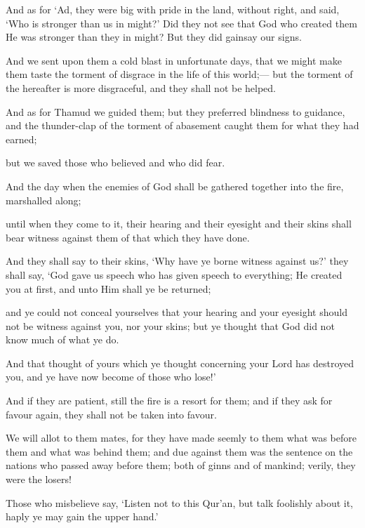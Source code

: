 \documentclass[fontsize=14pt, letterpaper, notitlepage, openany, DIV=12]{scrbook} %
\begin{document}
\noindent[41:15]
And as for `Ad, they were big with pride in the land, without right, and said, `Who is
stronger than us in might?' Did they not see that God who created them He was stronger than
they in might? But they did gainsay our signs.

\noindent[41:16]
And we sent upon them a cold blast in unfortunate days, that we might make them taste
the torment of disgrace in the life of this world;--- but the torment of the hereafter is more
disgraceful, and they shall not be helped.

\noindent[41:17]
And as for Thamud we guided them; but they preferred blindness to guidance, and the
thunder-clap of the torment of abasement caught them for what they had earned;

\noindent[41:18]
but we saved those who believed and who did fear.

\noindent[41:19]
And the day when the enemies of God shall be gathered together into the fire, marshalled
along;

\noindent[41:20]
until when they come to it, their hearing and their eyesight and their skins shall bear
witness against them of that which they have done.

\noindent[41:21]
And they shall say to their skins, `Why have ye borne witness against us?' they shall say,
`God gave us speech who has given speech to everything; He created you at first, and unto Him
shall ye be returned;

\noindent[41:22]
and ye could not conceal yourselves that your hearing and your eyesight should not be
witness against you, nor your skins; but ye thought that God did not know much of what ye do.

\noindent[41:23]
And that thought of yours which ye thought concerning your Lord has destroyed you, and
ye have now become of those who lose!'

\noindent[41:24]
And if they are patient, still the fire is a resort for them; and if they ask for favour again,
they shall not be taken into favour.

\noindent[41:25]
We will allot to them mates, for they have made seemly to them what was before them
and what was behind them; and due against them was the sentence on the nations who passed
away before them; both of ginns and of mankind; verily, they were the losers!

\noindent[41:26]
Those who misbelieve say, `Listen not to this Qur'an, but talk foolishly about it, haply ye
may gain the upper hand.'
\end{document}
